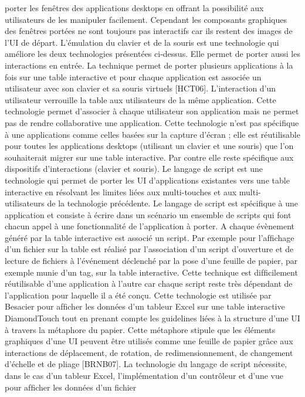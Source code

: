\documentclass{article}
\begin{document}
porter les fenêtres des applications desktops en offrant la possibilité aux utilisateurs de les manipuler
facilement. Cependant les composants graphiques des fenêtres portées ne sont toujours pas interactifs
car ils restent des images de l’UI de départ.
L’émulation du clavier et de la souris
est une technologie qui améliore les deux technologies
présentées ci-dessus. Elle permet de porter aussi les interactions en entrée. La technique permet de
porter plusieurs applications à la fois sur une table interactive et pour chaque application est associée
un utilisateur avec son clavier et sa souris virtuels [HCT06]. L’interaction d’un utilisateur verrouille la
table aux utilisateurs de la même application. Cette technologie permet d’associer à chaque utilisateur
son application mais ne permet pas de rendre collaborative une application. Cette technologie n’est
pas spéciﬁque à une applications comme celles basées sur la capture d’écran ; elle est réutilisable pour
toutes les applications desktops (utilisant un clavier et une souris) que l’on souhaiterait migrer sur une
table interactive. Par contre elle reste spéciﬁque aux dispositifs d’interactions (clavier et souris).
Le langage de script
est une technologie qui permet de porter les UI d’applications existantes vers
une table interactive en résolvant les limites liées aux multi-touches et aux multi-utilisateurs de la
technologie précédente. Le langage de script est spéciﬁque à une application et consiste à écrire dans
un scénario un ensemble de scripts qui font chacun appel à une fonctionnalité de l’application à porter.
A chaque évènement généré par la table interactive est associé un script. Par exemple pour l’afﬁchage
d’un ﬁchier sur la table est réalisé par l’association d’un script d’ouverture et de lecture de ﬁchiers à
l’événement déclenché par la pose d’une feuille de papier, par exemple munie d’un tag, sur la table
interactive. Cette technique est difﬁcilement réutilisable d’une application à l’autre car chaque script
reste très dépendant de l’application pour laquelle il a été conçu. Cette technologie est utilisée par
Besacier pour afﬁcher les données d’un tableur Excel sur une table interactive DiamondTouch tout
en prenant compte les guidelines liées à la structure d’une UI à travers la métaphore du papier. Cette
métaphore stipule que les éléments graphiques d’une UI peuvent être utilisés comme une feuille de
papier grâce aux interactions de déplacement, de rotation, de redimensionnement, de changement
d’échelle et de pliage [BRNB07]. La technologie du langage de script nécessite, dans le cas d’un
tableur Excel, l’implémentation d’un contrôleur et d’une vue pour afﬁcher les données d’un ﬁchier
\end{document}
